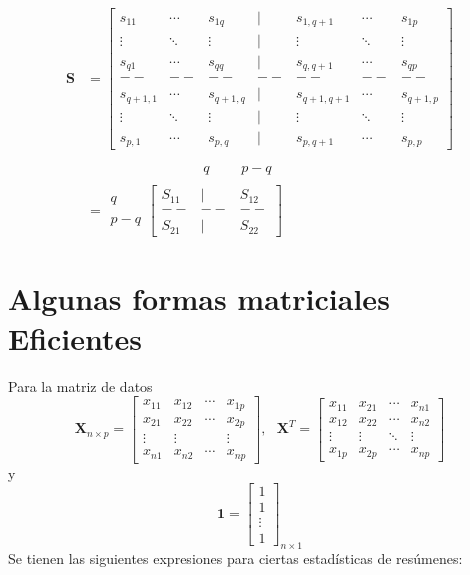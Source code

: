 \documentclass[
]{book}
\theoremstyle{definition}
\theoremstyle{definition}
\theoremstyle{definition}
\theoremstyle{definition}
\theoremstyle{remark}
\begin{document}
\begin{align*}
\mathbf{S}&=\begin{bmatrix}
s_{11} & \cdots & s_{1q} & | & s_{1,q+1} & \cdots & s_{1p} \\
\vdots & \ddots & \vdots & | & \vdots & \ddots & \vdots \\
s_{q1} & \cdots & s_{qq} & | & s_{q,q+1} & \cdots & s_{qp} \\
-- & -- & -- & -- & -- & -- & -- \\
s_{q+1,1} & \cdots & s_{q+1,q} & | & s_{q+1,q+1} & \cdots & s_{q+1,p} \\
\vdots &\ddots & \vdots & | & \vdots &\ddots & \vdots \\
s_{p,1} & \cdots & s_{p,q} & | & s_{p,q+1} & \cdots & s_{p,p}
\end{bmatrix}\\ \\
& \hspace{2cm}\begin{array}{ccccccc}
&& & & q & & \ \ \ p-q
\end{array}\\
&= \begin{array}{c}
q \\ \\ p-q
\end{array}
\begin{bmatrix}
S_{11} & | & S_{12} \\
-- & -- & -- \\
S_{21} & | & S_{22}
\end{bmatrix}
\end{align*}

\hypertarget{algunas-formas-matriciales-eficientes}{%
\section{Algunas formas matriciales Eficientes}\label{algunas-formas-matriciales-eficientes}}

Para la matriz de datos
\[
\mathbf{X}_{n\times p}=\begin{bmatrix}
x_{11} & x_{12} & \cdots & x_{1p}\\
x_{21} & x_{22} & \cdots & x_{2p}\\
\vdots & \vdots & & \vdots \\
x_{n1} & x_{n2} & \cdots & x_{np}
\end{bmatrix}, \ \ \ \mathbf{X}^T=\begin{bmatrix}
x_{11} & x_{21} & \cdots & x_{n1}\\
x_{12} & x_{22} & \cdots & x_{n2}\\
\vdots & \vdots &\ddots & \vdots \\
x_{1p} & x_{2p} & \cdots & x_{np}
\end{bmatrix}
\]
y
\[
\mathbf{1}=\begin{bmatrix}
1 \\ 1 \\ \vdots \\ 1
\end{bmatrix}_{n\times 1}
\]
Se tienen las siguientes expresiones para ciertas estadísticas de resúmenes:
\end{document}
